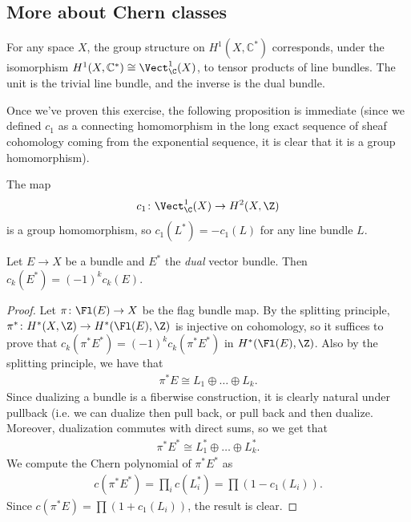 \documentclass[11pt]{book}
\begin{document}
\subsection{More about Chern classes}

\begin{exercise} For any space $X$, the group structure on $H^1(X,\mathbb{C}^\ast)$ corresponds, under the isomorphism $H^1(X,\mathbb{C}^\ast) \cong \Vect_\C^1(X)$, to tensor products of line bundles. The unit is the trivial line bundle, and the inverse is the dual bundle.
\end{exercise}

Once we've proven this exercise, the following proposition is immediate (since we defined $c_1$ as a connecting homomorphism in the long exact sequence of sheaf cohomology coming from the exponential sequence, it is clear that it is a group homomorphism).

\begin{proposition} The map
\begin{align*}
    c_1 \colon \Vect_\C^1(X) \to H^2(X,\Z)
\end{align*}
is a group homomorphism, so $c_1(L^\ast) = -c_1(L)$ for any line bundle $L$.
\end{proposition}

\begin{corollary} Let $E \to X$ be a bundle and $E^\ast$ the \emph{dual} vector bundle. Then $c_k(E^\ast) = (-1)^k c_k(E)$.
\end{corollary}
\begin{proof} Let $\pi \colon \Fl(E) \to X$ be the flag bundle map. By the splitting principle, $\pi^\ast \colon H^\ast(X,\Z) \to H^\ast(\Fl(E),\Z)$ is injective on cohomology, so it suffices to prove that $c_k(\pi^\ast E^\ast) = (-1)^k c_k(\pi^\ast E^\ast)$ in $H^\ast(\Fl(E),\Z)$. Also by the splitting principle, we have that
\begin{align*}
    \pi^\ast E \cong L_1 \oplus \ldots \oplus L_k.
\end{align*}
Since dualizing a bundle is a fiberwise construction, it is clearly natural under pullback (i.e. we can dualize then pull back, or pull back and then dualize. Moreover, dualization commutes with direct sums, so we get that
\begin{align*}
    \pi^\ast E^\ast \cong L_1^\ast \oplus \ldots \oplus L_k^\ast.
\end{align*}
We compute the Chern polynomial of $\pi^\ast E^\ast$ as
\begin{align*}
    c(\pi^\ast E^\ast) = \prod_i c(L_i^\ast) = \prod (1 - c_1(L_i)).
\end{align*}
Since $c(\pi^\ast E) = \prod (1+ c_1(L_i))$, the result is clear.
\end{proof}
\end{document}
